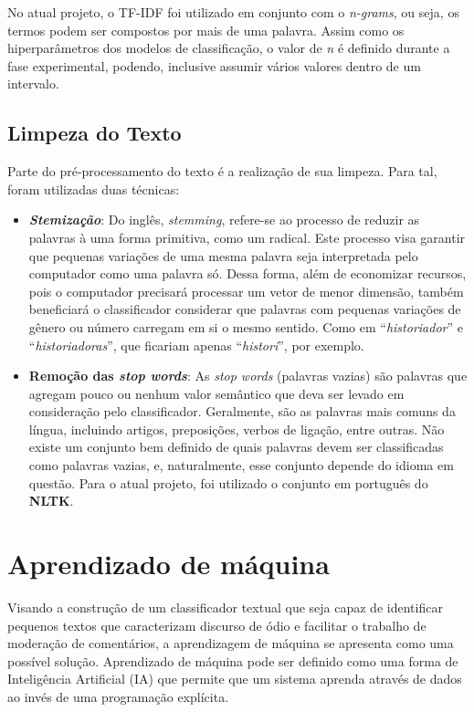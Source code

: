 No atual projeto, o TF-IDF foi utilizado em conjunto com o \textit{n-grams}, ou seja, os termos podem ser compostos por mais de uma palavra. Assim como os hiperparâmetros dos modelos de classificação, o valor de \textit{n} é definido durante a fase experimental, podendo, inclusive assumir vários valores dentro de um intervalo.

\subsection{Limpeza do Texto}

Parte do pré-processamento do texto é a realização de sua limpeza. Para tal, foram utilizadas duas técnicas:

\begin{itemize}
\item \textbf{\textit{Stemização}}: Do inglês, \textit{stemming}, refere-se ao processo de reduzir as palavras à uma forma primitiva, como um radical. Este processo visa garantir que pequenas variações de uma mesma palavra seja interpretada pelo computador como uma palavra só. Dessa forma, além de economizar recursos, pois o computador precisará processar um vetor de menor dimensão, também beneficiará o classificador considerar que palavras com pequenas variações de gênero ou número carregam em si o mesmo sentido. Como em “\textit{historiador}” e “\textit{historiadoras}”, que ficariam apenas “\textit{histori}”, por exemplo.

\item \textbf{Remoção das \textit{stop words}}: As \textit{stop words} (palavras vazias) são palavras que agregam pouco ou nenhum valor semântico que deva ser levado em consideração pelo classificador. Geralmente, são as palavras mais comuns da língua, incluindo artigos, preposições, verbos de ligação, entre outras. Não existe um conjunto bem definido de quais palavras devem ser classificadas como palavras vazias, e, naturalmente, esse conjunto depende do idioma em questão. Para o atual projeto, foi utilizado o conjunto em português do \textbf{NLTK}.
\end{itemize}

\section{Aprendizado de máquina}

Visando a construção de um classificador textual que seja capaz de identificar pequenos textos que caracterizam discurso de ódio e facilitar o trabalho de moderação de comentários, a aprendizagem de máquina se apresenta como uma possível solução. Aprendizado de máquina pode ser definido como uma forma de Inteligência Artificial (IA) que permite que um sistema aprenda através de dados ao invés de uma programação explícita. \cite{mlfordummyes:2018}

